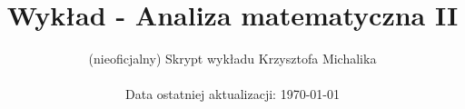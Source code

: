 \documentclass[12pt]{article}
\author{(nieoficjalny) Skrypt wykładu Krzysztofa Michalika \\ \\ Data ostatniej aktualizacji: \today}
\date{}
\title{Wykład - Analiza matematyczna II}
\begin{document}
\maketitle
\tableofcontents

\pagebreak


\pagebreak


\pagebreak


\pagebreak


\pagebreak


\pagebreak


\pagebreak


\pagebreak


\pagebreak


\pagebreak
\end{document}
